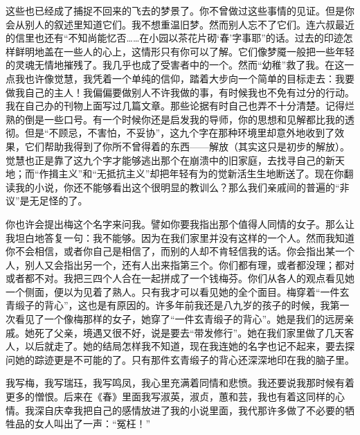 \par 这些也已经成了捕捉不回来的飞去的梦景了。你不曾做过这些事情的见证。但是你会从别人的叙述里知道它们。我不想重温旧梦。然而别人忘不了它们。连六叔最近的信里也还有“不知尚能忆否……在小园以茶花片砌‘春’字事耶”的话。过去的印迹怎样鲜明地盖在一些人的心上，这情形只有你可以了解。它们像梦魇一般把一些年轻的灵魂无情地摧残了。我几乎也成了受害者中的一个。然而“幼稚”救了我。在这一点我也许像觉慧，我凭着一个单纯的信仰，踏着大步向一个简单的目标走去：我要做我自己的主人！我偏偏要做别人不许我做的事，有时候我也不免有过分的行动。我在自己办的刊物上面写过几篇文章。那些论据有时自己也弄不十分清楚。记得烂熟的倒是一些口号。有一个时候你还是启发我的导师，你的思想和见解都比我的透彻。但是“不顾忌，不害怕，不妥协”，这九个字在那种环境里却意外地收到了效果，它们帮助我得到了你所不曾得着的东西——解放（其实这只是初步的解放）。觉慧也正是靠了这九个字才能够逃出那个在崩溃中的旧家庭，去找寻自己的新天地；而“作揖主义”和“无抵抗主义”却把年轻有为的觉新活生生地断送了。现在你翻读我的小说，你还不能够看出这个很明显的教训么？那么我们亲戚间的普遍的“非议”是无足怪的了。
\par 你也许会提出梅这个名字来问我。譬如你要我指出那个值得人同情的女子。那么让我坦白地答复一句：我不能够。因为在我们家里并没有这样的一个人。然而我知道你不会相信，或者你自己是相信了，而别的人却不肯轻信我的话。你会指出某一个人，别人又会指出另一个，还有人出来指第三个。你们都有理，或者都没理；都对或者都不对。我把三四个人合在一起拼成了一个钱梅芬。你们从各人的观点看见她一个侧面，便以为见着了熟人。只有我才可以看见她的全个面目。梅穿着“一件玄青缎子的背心”，这也是有原因的。许多年前我还是八九岁的孩子的时候，我第一次看见了一个像梅那样的女子，她穿了“一件玄青缎子的背心”。她是我们的远房亲戚。她死了父亲，境遇又很不好，说是要去“带发修行”。她在我们家里做了几天客人，以后就走了。她的结局怎样我不知道，现在我连她的名字也记不起来，要去探问她的踪迹更是不可能的了。只有那件玄青缎子的背心还深深地印在我的脑子里。
\par 我写梅，我写瑞珏，我写鸣凤，我心里充满着同情和悲愤。我还要说我那时候有着更多的憎恨。后来在《春》里面我写淑英，淑贞，蕙和芸，我也有着这同样的心情。我深自庆幸我把自己的感情放进了我的小说里面，我代那许多做了不必要的牺牲品的女人叫出了一声：“冤枉！”
